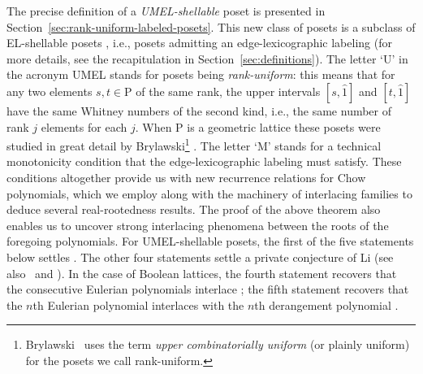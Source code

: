 \documentclass[11pt,a4paper]{amsart}
\theoremstyle{results}
\theoremstyle{definitions}
\def\P{\mathbb{P}}
\renewcommand{\P}{\mathrm{P}}
\begin{document}
The precise definition of a \emph{UMEL-shellable} poset is presented in Section~\ref{sec:rank-uniform-labeled-posets}. This new class of posets is a subclass of EL-shellable posets \cite{bjorner-el-shellable}, i.e., posets admitting an edge-lexicographic labeling (for more details, see the recapitulation in Section~\ref{sec:definitions}). The letter `U' in the acronym UMEL stands for posets being \emph{rank-uniform}: this means that for any two elements $s,t\in \P$ of the same rank, the upper intervals $[s,\widehat{1}]$ and $[t,\widehat{1}]$ have the same Whitney numbers of the second kind, i.e., the same number of rank $j$ elements for each $j$. When $\P$ is a geometric lattice these posets were studied in great detail by Brylawski\footnote{Brylawski~\cite[p.~223]{brylawski} uses the term \emph{upper combinatorially uniform} (or plainly uniform) for the posets we call rank-uniform.} \cite{brylawski}. The letter `M' stands for a technical monotonicity condition that the edge-lexicographic labeling must satisfy. These conditions altogether provide us with new recurrence relations for Chow polynomials, which we employ along with the machinery of interlacing families to deduce several real-rootedness results. The proof of the above theorem also enables us to uncover strong interlacing phenomena between the roots of the foregoing polynomials. For UMEL-shellable posets, the first of the five statements below settles \cite[Conjecture~5.7]{ferroni-matherne-stevens-vecchi}. The other four statements settle a private conjecture of Li (see also~ and ). In the case of Boolean lattices, the fourth statement recovers that the consecutive Eulerian polynomials interlace \cite[Theorem 2.7]{savage2015}; the fifth statement recovers that the $n$th Eulerian polynomial interlaces with the $n$th derangement polynomial {\cite[Proof of Theorem 3.6]{branden2021symmetric}}. 
\end{document}
